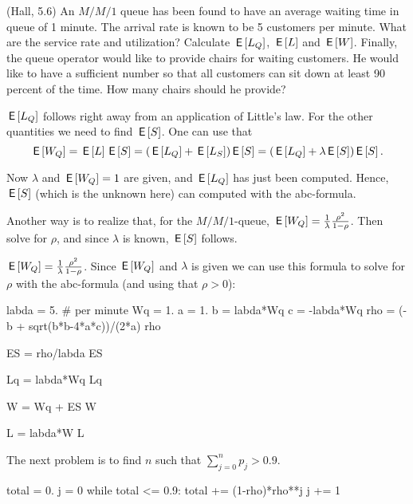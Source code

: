 \begin{exercise}(Hall, 5.6)
  An $M/M/1$ queue has been found to have an average waiting time in queue of 1 minute. The arrival rate is known to be 5 customers per minute.
 What are the service rate and utilization? Calculate $\,\mathsf{E}\left[L_Q\right]$,  $\,\mathsf{E}\left[L\right]$ and $\,\mathsf{E}\left[W\right]$. Finally, 
 the queue operator would like to provide chairs for waiting customers. He would like to have a sufficient number so that all customers can sit down at least 90 percent of the time. How many chairs should he provide?

 \begin{hint}
$\,\mathsf{E}\left[L_Q\right]$ follows right away from an application of Little's law. For the other quantities we need to find $\,\mathsf{E}\left[S\right]$.  One can use that 
\begin{equation*}
\,\mathsf{E}\left[W_Q\right]= \,\mathsf{E}\left[L\right] \,\mathsf{E}\left[S\right] = (\,\mathsf{E}\left[L_Q\right] + \,\mathsf{E}\left[L_S\right]) \,\mathsf{E}\left[S\right] = (\,\mathsf{E}\left[L_Q\right] + \lambda \,\mathsf{E}\left[S\right])\,\mathsf{E}\left[S\right].
\end{equation*}


Now $\lambda$ and $\,\mathsf{E}\left[W_Q\right]=1$ are given, and $\,\mathsf{E}\left[L_Q\right]$ has just been computed. Hence, $\,\mathsf{E}\left[S\right]$ (which is the unknown here) can computed with the abc-formula.

Another way is to realize that, for the $M/M/1$-queue,  $\,\mathsf{E}\left[W_Q\right] = \frac{1}{\lambda}\frac{\rho^2}{1-\rho}$. Then solve for $\rho$, and since $\lambda$ is known, $\,\mathsf{E}\left[S\right]$ follows. 
 \end{hint}
    \begin{solution}


 $\,\mathsf{E}\left[W_Q\right] = \frac{1}{\lambda}\frac{\rho^2}{1-\rho}$. Since
        $\,\mathsf{E}\left[W_Q\right]$ and $\lambda$ is given we can use this formula to
        solve for $\rho$ with the abc-formula (and using that
        $\rho > 0$):

\begin{pyconsole}
labda = 5. # per minute
Wq = 1.
a = 1.
b = labda*Wq
c = -labda*Wq
rho = (-b + sqrt(b*b-4*a*c))/(2*a)
rho 

ES = rho/labda
ES
\end{pyconsole} 


\begin{pyconsole}
Lq = labda*Wq
Lq

W = Wq + ES
W

L = labda*W
L
\end{pyconsole} 


The next problem is to find $n$ such that
      $\sum_{j=0}^n p_j > 0.9$.

\begin{pyconsole} 
total = 0. 
j = 0
while total <= 0.9:
   total += (1-rho)*rho**j
   j += 1


\end{pyconsole}
\end{solution}
\end{exercise}
